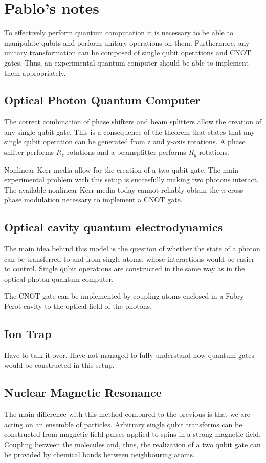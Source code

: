 \section{Pablo's notes}

To effectively perform quantum computation it is necessary to be able to manipulate qubits and perform unitary operations on them. Furthermore, any unitary transformation can be composed of single qubit operations and CNOT gates. Thus, an experimental quantum computer should be able to implement them appropriately.

\subsection{Optical Photon Quantum Computer}

The correct combination of phase shifters and beam splitters allow the creation of any single qubit gate. This is a consequence of the theorem that states that any single qubit operation can be generated from z and y-axis rotations. A phase shifter performs $R_{z}$ rotations and a beamsplitter performs $R_{y}$ rotations.

Nonlinear Kerr media allow for the creation of a two qubit gate. The main experimental problem with this setup is succesfully making two photons interact. The available nonlinear Kerr media today cannot reliably obtain the $\pi$ cross phase modulation necessary to implement a CNOT gate. 

\subsection{Optical cavity quantum electrodynamics}

The main idea behind this model is the question of whether the state of a photon can be transferred to and from single atoms, whose interactions would be easier to control. Single qubit operations are constructed in the same way as in the optical photon quantum computer.

The CNOT gate can be implemented by coupling atoms enclosed in a Fabry-Perot cavity to the optical field of the photons.

\subsection{Ion Trap}

Have to talk it over. Have not managed to fully understand how quantum gates would be constructed in this setup.

\subsection{Nuclear Magnetic Resonance}

The main difference with this method compared to the previous is that we are acting on an ensemble of particles. Arbitrary single qubit transforms can be constructed from magnetic field pulses applied to spins in a strong magnetic field. Coupling between the molecules and, thus, the realization of a two qubit gate can be provided by chemical bonds between neighbouring atoms.
